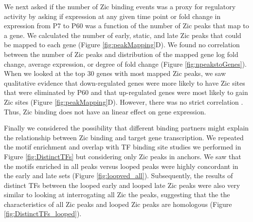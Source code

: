 \documentclass[fleqn,10pt]{wlscirep}
\begin{document}
We next asked if the number of Zic binding events was a proxy for regulatory activity by asking if expression at any given time point or fold change in expression from P7 to P60 was a function of the number of Zic peaks that map to a gene. We calculated the number of early, static, and late Zic peaks that could be mapped to each gene (Figure \ref{fig:peakMapping}D). We found no correlation between the number of Zic peaks and distribution of the mapped gene log fold change, average expression, or degree of fold change (Figure \ref{fig:npeakstoGenes}). When we looked at the top 30 genes with most mapped Zic peaks, we saw qualitative evidence that down-regulated genes were more likely to have Zic sites that were eliminated by P60 and that up-regulated genes were most likely to gain Zic sites (Figure \ref{fig:peakMapping}D). However, there was no strict correlation . Thus, Zic binding does not have an linear effect on gene expression.

Finally we considered the possibility that different binding partners might explain the relationship between Zic binding and target gene transcription. We repeated the motif enrichment and overlap with TF binding site studies we performed in Figure \ref{fig:DistinctTFs} but considering only Zic peaks in anchors. We saw that the motifs enriched in all peaks versus looped peaks were highly concordant in the early and late sets (Figure \ref{fig:loopved_all}). Subsequently, the results of distinct TFs between the looped early and looped late Zic peaks were also very similar to looking at interrogating all Zic the peaks, suggesting that the the characteristics of all Zic peaks and looped Zic peaks are homologous (Figure \ref{fig:DistinctTFs_looped}). 
\end{document}
